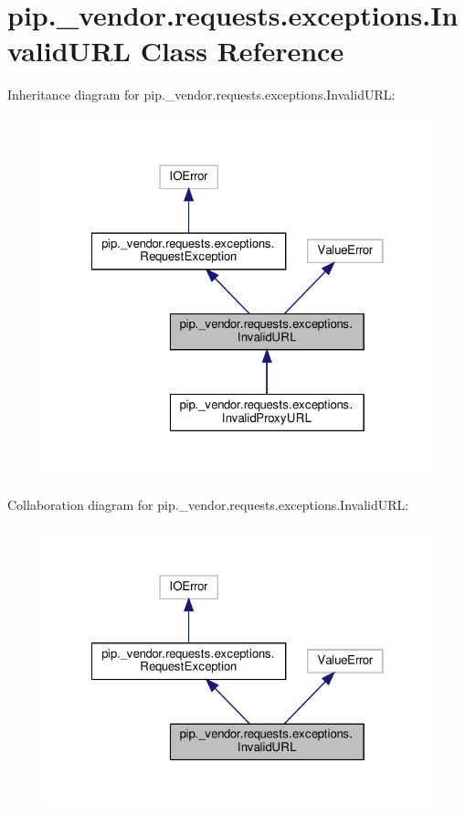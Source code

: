 \hypertarget{classpip_1_1__vendor_1_1requests_1_1exceptions_1_1InvalidURL}{}\section{pip.\+\_\+vendor.\+requests.\+exceptions.\+Invalid\+U\+RL Class Reference}
\label{classpip_1_1__vendor_1_1requests_1_1exceptions_1_1InvalidURL}


Inheritance diagram for pip.\+\_\+vendor.\+requests.\+exceptions.\+Invalid\+U\+RL\+:
\nopagebreak
\begin{figure}[H]
\begin{center}
\leavevmode
\includegraphics[width=322pt]{classpip_1_1__vendor_1_1requests_1_1exceptions_1_1InvalidURL__inherit__graph}
\end{center}
\end{figure}


Collaboration diagram for pip.\+\_\+vendor.\+requests.\+exceptions.\+Invalid\+U\+RL\+:
\nopagebreak
\begin{figure}[H]
\begin{center}
\leavevmode
\includegraphics[width=322pt]{classpip_1_1__vendor_1_1requests_1_1exceptions_1_1InvalidURL__coll__graph}
\end{center}
\end{figure}

